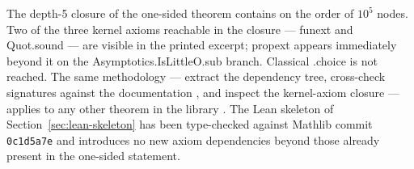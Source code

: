 \documentclass[11pt,reqno]{amsart}
\begin{document}
\noindent The depth-5 closure of the one-sided theorem contains on the order
of $10^{5}$ nodes. Two of the three kernel axioms reachable in the closure
--- \textsf{funext} and \textsf{Quot\allowbreak.sound} --- are visible in
the printed excerpt; \textsf{propext} appears immediately beyond it on the 
\textsf{Asymptotics.IsLittleO.sub} branch. \textsf{Classical
\allowbreak.choice} is not reached. The same methodology --- extract the
dependency tree, cross-check signatures against the documentation \cite%
{mathlib4-docs}, and inspect the kernel-axiom closure --- applies to any
other theorem in the library \cite{mathlib4, mathlibgraph2026}. The Lean
skeleton of Section~\ref{sec:lean-skeleton} has been type-checked against
Mathlib commit \texttt{0c1d5a7e}{} and introduces no new axiom dependencies
beyond those already present in the one-sided statement.
\end{document}
